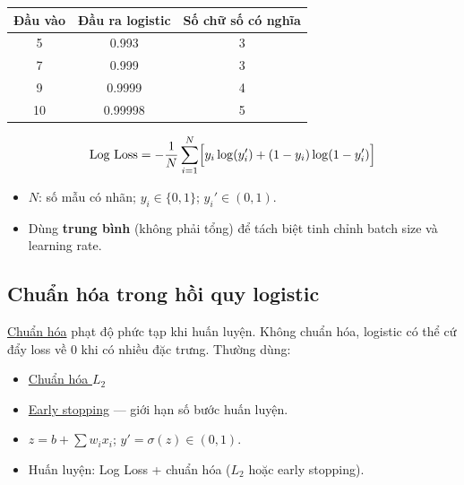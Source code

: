 \documentclass[12pt,a4paper]{article}
\begin{document}
\begin{vidu}[title={Độ chính xác cần thiết khi $z$ lớn}]
\begin{center}
\small
\begin{tabular}{ccc}
\textbf{Đầu vào} & \textbf{Đầu ra logistic} & \textbf{Số chữ số có nghĩa} \\
\midrule
5 & 0.993 & 3 \\
7 & 0.999 & 3 \\
9 & 0.9999 & 4 \\
10 & 0.99998 & 5 \\
\end{tabular}
\end{center}
\end{vidu}

\begin{congthuc}[title={Log Loss (trung bình trên $N$ mẫu)}]
\[
  \text{Log Loss} = -\frac{1}{N}\sum_{i=1}^{N}\Bigl[y_i\log(y_i') + (1-y_i)\log(1-y_i')\Bigr]
\]
\begin{itemize}
  \item $N$: số mẫu có nhãn; $y_i \in \{0,1\}$; $y_i' \in (0,1)$.
  \item Dùng \textbf{trung bình} (không phải tổng) để tách biệt tinh chỉnh batch size và learning rate.
\end{itemize}
\end{congthuc}

\subsection{Chuẩn hóa trong hồi quy logistic}

\begin{dinhnghia}[title={Chuẩn hóa (Regularization)}]
\href{https://developers.google.com/machine-learning/glossary\#regularization}{Chuẩn hóa} phạt độ phức tạp khi huấn luyện. Không chuẩn hóa, logistic có thể cứ đẩy loss về 0 khi có nhiều đặc trưng. Thường dùng:
\begin{itemize}
  \item \href{https://developers.google.com/machine-learning/crash-course/overfitting/regularization}{Chuẩn hóa $L_2$}
  \item \href{https://developers.google.com/machine-learning/crash-course/overfitting/regularization\#early_stopping_an_alternative_to_complexity-based_regularization}{Early stopping} --- giới hạn số bước huấn luyện.
\end{itemize}
\end{dinhnghia}

\begin{tongket}[title={Tổng kết chương --- Hồi quy logistic}]
\begin{itemize}
  \item $z = b + \sum w_i x_i$; $y' = \sigma(z) \in (0,1)$.
  \item Huấn luyện: Log Loss + chuẩn hóa ($L_2$ hoặc early stopping).
\end{itemize}
\end{tongket}
\end{document}
